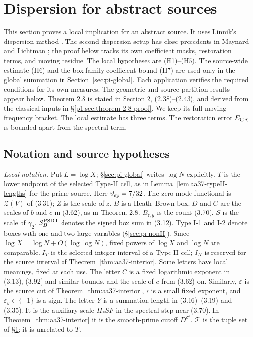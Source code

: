 \section{Dispersion for abstract sources}\label{sec:pi-psdt}

This section proves a local implication for an abstract source.
It uses Linnik's dispersion method \cite{Linnik63}. The second-dispersion
setup has close precedents in Maynard \cite{MaynardII} and Lichtman
\cite[\S5]{Lichtman23}; the proof below tracks its own coefficient
masks, restoration terms, and moving residue.
The local hypotheses are (H1)--(H5). The source-wide estimate (H6)
and the box-family coefficient bound (H7) are used only in the
global summation in Section~\ref{sec:pi-global}.
Each application verifies the required conditions for its own measures.
The geometric and source partition results appear below.
Theorem 2.8 is stated in
Section 2, (2.38)--(2.43), and derived from the classical inputs in
\S\ref{p1:sec:theorem-2-8-proof}. We keep its full moving-frequency bracket.
The local estimate has three terms.
The restoration error $E_{\rm GR}$ is bounded apart from the spectral term.

\subsection{Notation and source hypotheses}

\emph{Local notation.} Put $L=\log X$; \S\ref{sec:pi-global} writes $\log N$ explicitly. $T$ is the lower endpoint of the selected Type-II cell, as in Lemma~\ref{lem:aa37-typeII-lengths} for the prime source. Here $\vartheta_{\rm sp}=7/32$. The zero-mode functional is $\mathcal Z(V)$ of (3.31); $Z$ is the scale of $z$. $B$ is a Heath--Brown box. $D$ and $C$ are the scales of $b$ and $c$ in (3.62), as in Theorem 2.8. $B_{z,y}$ is the count (3.70). $S$ is the scale of $\gamma_2$. $S_B^{\rm PSDT}$ denotes the signed box sum in (3.12). Type I-1 and I-2 denote boxes with one and two large variables (\S\ref{sec:pi-nonII}). Since $\log X=\log N+O(\log\log N)$, fixed powers of $\log X$ and $\log N$ are comparable.
$I_T$ is the selected integer interval of a Type-II cell; $I_N$ is reserved for the source interval of Theorem~\ref{thm:aa37-interior}.
Some letters have local meanings, fixed at each use.
The letter $C$ is a fixed logarithmic exponent in (3.13), (3.92) and similar bounds, and the scale of $c$ from (3.62) on.
Similarly, $\varepsilon$ is the source cut of Theorem~\ref{thm:aa37-interior}, $\epsilon$ is a small fixed exponent, and $\varepsilon_y\in\{\pm1\}$ is a sign.
The letter $Y$ is a summation length in (3.16)--(3.19) and (3.35).
It is the auxiliary scale $H_*SF$ in the spectral step near (3.70).
In Theorem~\ref{thm:aa37-interior} it is the smooth-prime cutoff $D^{\sigma^2}$.
$\mathcal T$ is the tuple set of \S\ref{sec:pi-psdt}; it is unrelated to $T$.

